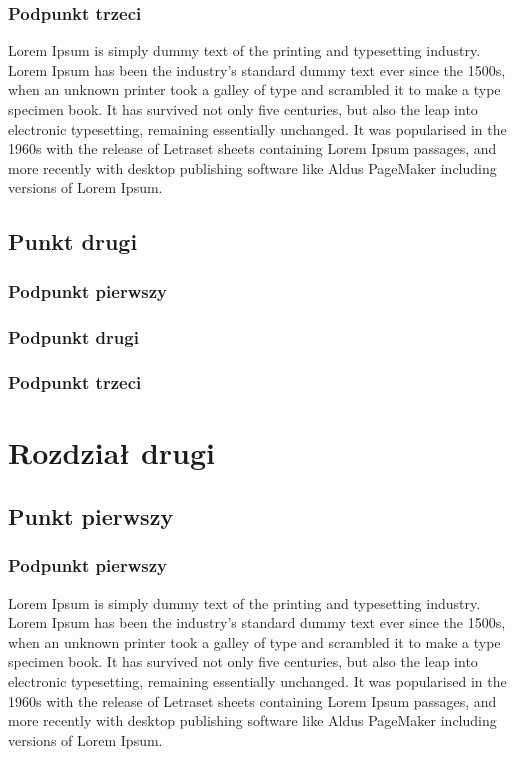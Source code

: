             \subsection{Podpunkt trzeci}
                Lorem Ipsum is simply dummy text of the printing and typesetting industry. Lorem Ipsum has been the industry's standard dummy text ever since the 1500s, when an unknown printer took a galley of type and scrambled it to make a type specimen book. It has survived not only five centuries, but also the leap into electronic typesetting, remaining essentially unchanged. It was popularised in the 1960s with the release of Letraset sheets containing Lorem Ipsum passages, and more recently with desktop publishing software like Aldus PageMaker including versions of Lorem Ipsum.  
        \section{Punkt drugi}
            \subsection{Podpunkt pierwszy}
            \subsection{Podpunkt drugi}
            \subsection{Podpunkt trzeci}
    \chapter{Rozdział drugi} 
    \section{Punkt pierwszy}
        \subsection{Podpunkt pierwszy}
            Lorem Ipsum is simply dummy text of the printing and typesetting industry. Lorem Ipsum has been the industry's standard dummy text ever since the 1500s, when an unknown printer took a galley of type and scrambled it to make a type specimen book. It has survived not only five centuries, but also the leap into electronic typesetting, remaining essentially unchanged. It was popularised in the 1960s with the release of Letraset sheets containing Lorem Ipsum passages, and more recently with desktop publishing software like Aldus PageMaker including versions of Lorem Ipsum.
